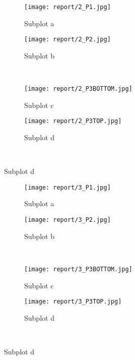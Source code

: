 \documentclass{article}%
\begin{document}
\begin{figure}[h!]%
\caption{3HAFTERSTARTFIRE}%
\centering%
\begin{subfigure}{0.45\textwidth}%
\texttt{[image:  report/2\_P1.jpg]}%
\caption{Subplot a}%
\end{subfigure}%
\begin{subfigure}{0.45\textwidth}%
\texttt{[image:  report/2\_P2.jpg]}%
\caption{Subplot b}%
\end{subfigure}%
\\%
\begin{subfigure}{0.45\textwidth}%
\texttt{[image:  report/2\_P3BOTTOM.jpg]}%
\caption{Subplot c}%
\end{subfigure}%
\begin{subfigure}{0.45\textwidth}%
\texttt{[image:  report/2\_P3TOP.jpg]}%
\caption{Subplot d}%
\end{subfigure}%
\\%
\end{figure}

%


\begin{figure}[h!]%
\caption{4HAFTERSTARTFIRE}%
\centering%
\begin{subfigure}{0.45\textwidth}%
\texttt{[image:  report/3\_P1.jpg]}%
\caption{Subplot a}%
\end{subfigure}%
\begin{subfigure}{0.45\textwidth}%
\texttt{[image:  report/3\_P2.jpg]}%
\caption{Subplot b}%
\end{subfigure}%
\\%
\begin{subfigure}{0.45\textwidth}%
\texttt{[image:  report/3\_P3BOTTOM.jpg]}%
\caption{Subplot c}%
\end{subfigure}%
\begin{subfigure}{0.45\textwidth}%
\texttt{[image:  report/3\_P3TOP.jpg]}%
\caption{Subplot d}%
\end{subfigure}%
\\%
\end{figure}

%
\end{document}

